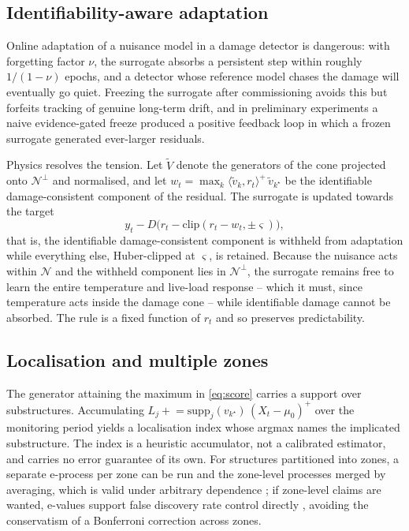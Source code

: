 \documentclass[12pt,a4paper]{article}
\newcommand{\rev}[1]{#1}
\newcommand{\rev}[1]{{\color{revcol}#1}}
\begin{document}
\subsection{Identifiability-aware adaptation}\label{sec:adapt}

Online adaptation of a nuisance model in a damage detector is dangerous: with forgetting factor $\nu$, the surrogate absorbs a persistent step within roughly $1/(1-\nu)$ epochs, and a detector whose reference model chases the damage will eventually go quiet. Freezing the surrogate after commissioning avoids this but forfeits tracking of genuine long-term drift, and in preliminary experiments a naive evidence-gated freeze produced a positive feedback loop in which a frozen surrogate generated ever-larger residuals.

Physics resolves the tension. Let $\tilde V$ denote the generators of the cone projected onto $\mathcal{N}^\perp$ and normalised, and let $w_t=\max_k\langle\tilde v_k,r_t\rangle^{+}\,\tilde v_{k^\star}$ be the identifiable damage-consistent component of the residual. The surrogate is updated towards the target
\begin{equation}
y_t - D\big(r_t-\mathrm{clip}(r_t-w_t,\pm\varsigma)\big),
\label{eq:filtered}
\end{equation}
that is, the identifiable damage-consistent component is withheld from adaptation while everything else, Huber-clipped at $\varsigma$, is retained. Because the nuisance acts within $\mathcal{N}$ and the withheld component lies in $\mathcal{N}^\perp$, the surrogate remains free to learn the entire temperature and live-load response -- which it must, since temperature acts inside the damage cone -- while identifiable damage cannot be absorbed. The rule is a fixed function of $r_t$ and so preserves predictability.

\subsection{Localisation and multiple zones}

The generator attaining the maximum in \eqref{eq:score} carries a support over substructures. Accumulating $L_j \mathrel{+}= \mathrm{supp}_j(v_{k^\star})\,(X_t-\mu_0)^{+}$ over the monitoring period yields a localisation index whose argmax names the implicated substructure. \rev{The index is a heuristic accumulator, not a calibrated estimator, and carries no error guarantee of its own.} For structures partitioned into zones, a separate e-process per zone can be run and the zone-level processes merged by averaging, which is valid under arbitrary dependence \citep{vovk2021evalues}; if zone-level claims are wanted, e-values support false discovery rate control directly \citep{wang2022fdr}, avoiding the conservatism of a Bonferroni correction across zones.
\end{document}
